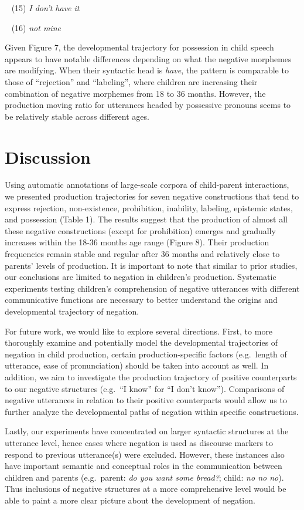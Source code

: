 \documentclass[10pt, letterpaper]{article}
\begin{document}
~ (15) \emph{I don't have it}

~ (16) \emph{not mine}

Given Figure 7, the developmental trajectory for possession in child
speech appears to have notable differences depending on what the
negative morphemes are modifying. When their syntactic head is
\emph{have}, the pattern is comparable to those of ``rejection'' and
``labeling'', where children are increasing their combination of
negative morphemes from 18 to 36 months. However, the production moving
ratio for utterances headed by possessive pronouns seems to be
relatively stable across different ages.

\hypertarget{discussion}{%
\section{Discussion}\label{discussion}}

Using automatic annotations of large-scale corpora of child-parent
interactions, we presented production trajectories for seven negative
constructions that tend to express rejection, non-existence,
prohibition, inability, labeling, epistemic states, and possession
(Table 1). The results suggest that the production of almost all these
negative constructions (except for prohibition) emerges and gradually
increases within the 18-36 months age range (Figure 8). Their production
frequencies remain stable and regular after 36 months and relatively
close to parents' levels of production. It is important to note that
similar to prior studies, our conclusions are limited to negation in
children's production. Systematic experiments testing children's
comprehension of negative utterances with different communicative
functions are necessary to better understand the origins and
developmental trajectory of negation.

For future work, we would like to explore several directions. First, to
more thoroughly examine and potentially model the developmental
trajectories of negation in child production, certain
production-specific factors (e.g.~length of utterance, ease of
pronunciation) should be taken into account as well. In addition, we aim
to investigate the production trajectory of positive counterparts to our
negative structures (e.g.~``I know'' for ``I don't know''). Comparisons
of negative utterances in relation to their positive counterparts would
allow us to further analyze the developmental paths of negation within
specific constructions.

Lastly, our experiments have concentrated on larger syntactic structures
at the utterance level, hence cases where negation is used as discourse
markers to respond to previous utterance(s) were excluded. However,
these instances also have important semantic and conceptual roles in the
communication between children and parents (e.g.~parent: \emph{do you
want some bread?}; child: \emph{no no no}). Thus inclusions of negative
structures at a more comprehensive level would be able to paint a more
clear picture about the development of negation.
\end{document}
